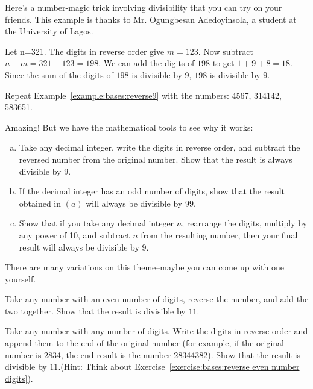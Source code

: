 Here's a number-magic trick involving divisibility that you can try on your friends. This example is thanks to Mr. Ogungbesan Adedoyinsola, a student at the University of Lagos.

\begin{example}\label{example:bases:reverse9}
Let n=321. The digits in reverse order give $m=123$. Now subtract $n-m=321-123=198$. We can add the digits of $198$ to get $1+9+8=18$. Since the sum of the digits of $198$ is divisible by $9$, $198$ is divisible by $9$.
\end{example}

\begin{exercise}
Repeat Example~\ref{example:bases:reverse9} with the numbers: 4567, 314142, 583651.
\end{exercise}

Amazing!  But we have the mathematical tools to see why it works:

\begin{exercise}\label{exercise:bases:decimal interger reverse order}
\begin{enumerate}[(a)]
\item Take any decimal integer, write the digits in reverse order, and subtract the reversed number from the original number. Show that the result is always divisible by $9$.\\
\item If the decimal integer has an odd number of digits, show that the result obtained in $(a)$ will always be divisible by $99$.
\item Show that if you take any decimal integer $n$, rearrange the digits, multiply by any power of 10, and  subtract $n$ from the resulting number, then your final result will always be divisible by 9. 
\end{enumerate}
\end{exercise}

There are many variations on this theme--maybe you can come up with one yourself.

\begin{exercise}\label{exercise:bases:reverse even number digits}
Take any number with an even number of digits, reverse the number, and add the two together. Show that the result is divisible by $11$.
\end{exercise}

\begin{exercise}\label{exercise:bases:append reverse order}
Take any number with any number of digits. Write the digits in reverse order and append them to the end of the original number (for example, if the original number is 2834, the end result is the number 28344382). Show that the result is divisible by $11$.(Hint: Think about Exercise~\ref{exercise:bases:reverse even number digits}). 
\end{exercise}

